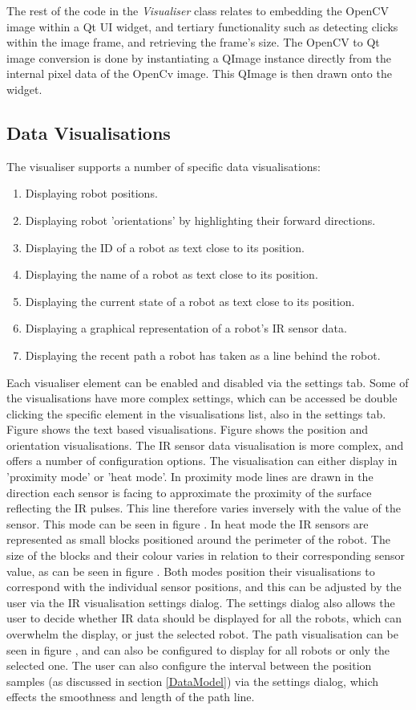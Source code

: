 The rest of the code in the \textit{Visualiser} class relates to embedding the OpenCV image within a Qt UI widget, and tertiary functionality such as detecting clicks within the image frame, and retrieving the frame's size. The OpenCV to Qt image conversion is done by instantiating a QImage instance directly from the internal pixel data of the OpenCv image. This QImage is then drawn onto the widget.

\subsection{Data Visualisations}
The visualiser supports a number of specific data visualisations:

\begin{enumerate}
 \item Displaying robot positions.
 \item Displaying robot 'orientations' by highlighting their forward directions.
 \item Displaying the ID of a robot as text close to its position.
 \item Displaying the name of a robot as text close to its position.
 \item Displaying the current state of a robot as text close to its position.
 \item Displaying a graphical representation of a robot's IR sensor data.
 \item Displaying the recent path a robot has taken as a line behind the robot.
\end{enumerate}

Each visualiser element can be enabled and disabled via the settings tab. Some of the visualisations have more complex settings, which can be accessed be double clicking the specific element in the visualisations list, also in the settings tab. Figure  shows the text based visualisations. Figure  shows the position and orientation visualisations. The IR sensor data visualisation is more complex, and offers a number of configuration options. The visualisation can either display in 'proximity mode' or 'heat mode'. In proximity mode lines are drawn in the direction each sensor is facing to approximate the proximity of the surface reflecting the IR pulses. This line therefore varies inversely with the value of the sensor. This mode can be seen in figure . In heat mode the IR sensors are represented as small blocks positioned around the perimeter of the robot. The size of the blocks and their colour varies in relation to their corresponding sensor value, as can be seen in figure . Both modes position their visualisations to correspond with the individual sensor positions, and this can be adjusted by the user via the IR visualisation settings dialog. The settings dialog also allows the user to decide whether IR data should be displayed for all the robots, which can overwhelm the display, or just the selected robot. The path visualisation can be seen in figure , and can also be configured to display for all robots or only the selected one. The user can also configure the interval between the position samples (as discussed in section \ref{DataModel}) via the settings dialog, which effects the smoothness and length of the path line.

